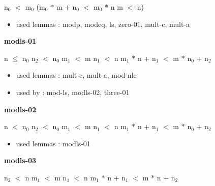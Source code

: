 \documentclass[a4paper]{article}
\begin{document}
\medskip

 \Fol $\mbox{n}_{0}$ $<$ $\mbox{m}_{0}$ \Imp ($\mbox{m}_{0}$ $*$ m + $\mbox{n}_{0}$ $<$ $\mbox{m}_{0}$ $*$ n \Equiv m $<$ n)

\begin{itemize}


\item       used lemmas  : modp, modeq, ls, zero-01, mult-c, mult-a

\end{itemize}

\medskip

\bigskip

{\large\bf modls-01}

\medskip

 \Fol n $\le$ $\mbox{n}_{0}$ \And $\mbox{n}_{2}$ $<$ $\mbox{n}_{0}$ \And $\mbox{m}_{1}$ $<$ m \And $\mbox{n}_{1}$ $<$ n \Imp $\mbox{m}_{1}$ $*$ n + $\mbox{n}_{1}$ $<$ m $*$ $\mbox{n}_{0}$ + $\mbox{n}_{2}$

\begin{itemize}


\item       used lemmas  : mult-c, mult-a, mod-nle
\item       used by      : mod-ls, modls-02, three-01

\end{itemize}

\medskip

\bigskip

{\large\bf modls-02}

\medskip

 \Fol n $<$ $\mbox{n}_{0}$ \And $\mbox{n}_{2}$ $<$ $\mbox{n}_{0}$ \And $\mbox{m}_{1}$ $<$ m \And $\mbox{n}_{1}$ $<$ n \Imp $\mbox{m}_{1}$ $*$ n + $\mbox{n}_{1}$ $<$ m $*$ $\mbox{n}_{0}$ + $\mbox{n}_{2}$

\begin{itemize}


\item       used lemmas  : modls-01

\end{itemize}

\medskip

\bigskip

{\large\bf modls-03}

\medskip

 \Fol $\mbox{n}_{2}$ $<$ n \And $\mbox{m}_{1}$ $<$ m \And $\mbox{n}_{1}$ $<$ n \Imp $\mbox{m}_{1}$ $*$ n + $\mbox{n}_{1}$ $<$ m $*$ n + $\mbox{n}_{2}$
\end{document}
